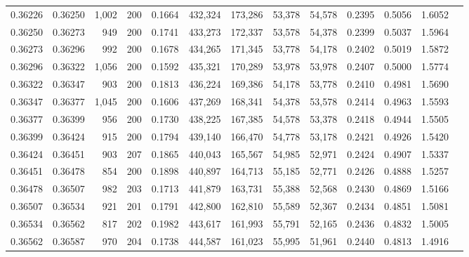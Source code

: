 \begin{tabular}{rrrrrrrrrrrrr}
0.36226 & 0.36250 & 1,002 & 200 &                                     0.1664 & 432,324 & 173,286 &  53,378 &  54,578 & 0.2395 & 0.5056 & 1.6052 \\
0.36250 & 0.36273 &   949 & 200 &                                     0.1741 & 433,273 & 172,337 &  53,578 &  54,378 & 0.2399 & 0.5037 & 1.5964 \\
0.36273 & 0.36296 &   992 & 200 &                                     0.1678 & 434,265 & 171,345 &  53,778 &  54,178 & 0.2402 & 0.5019 & 1.5872 \\
0.36296 & 0.36322 & 1,056 & 200 &                                     0.1592 & 435,321 & 170,289 &  53,978 &  53,978 & 0.2407 & 0.5000 & 1.5774 \\
0.36322 & 0.36347 &   903 & 200 &                                     0.1813 & 436,224 & 169,386 &  54,178 &  53,778 & 0.2410 & 0.4981 & 1.5690 \\
0.36347 & 0.36377 & 1,045 & 200 &                                     0.1606 & 437,269 & 168,341 &  54,378 &  53,578 & 0.2414 & 0.4963 & 1.5593 \\
0.36377 & 0.36399 &   956 & 200 &                                     0.1730 & 438,225 & 167,385 &  54,578 &  53,378 & 0.2418 & 0.4944 & 1.5505 \\
0.36399 & 0.36424 &   915 & 200 &                                     0.1794 & 439,140 & 166,470 &  54,778 &  53,178 & 0.2421 & 0.4926 & 1.5420 \\
0.36424 & 0.36451 &   903 & 207 &                                     0.1865 & 440,043 & 165,567 &  54,985 &  52,971 & 0.2424 & 0.4907 & 1.5337 \\
0.36451 & 0.36478 &   854 & 200 &                                     0.1898 & 440,897 & 164,713 &  55,185 &  52,771 & 0.2426 & 0.4888 & 1.5257 \\
0.36478 & 0.36507 &   982 & 203 &                                     0.1713 & 441,879 & 163,731 &  55,388 &  52,568 & 0.2430 & 0.4869 & 1.5166 \\
0.36507 & 0.36534 &   921 & 201 &                                     0.1791 & 442,800 & 162,810 &  55,589 &  52,367 & 0.2434 & 0.4851 & 1.5081 \\
0.36534 & 0.36562 &   817 & 202 &                                     0.1982 & 443,617 & 161,993 &  55,791 &  52,165 & 0.2436 & 0.4832 & 1.5005 \\
0.36562 & 0.36587 &   970 & 204 &                                     0.1738 & 444,587 & 161,023 &  55,995 &  51,961 & 0.2440 & 0.4813 & 1.4916 \\

\end{tabular}
